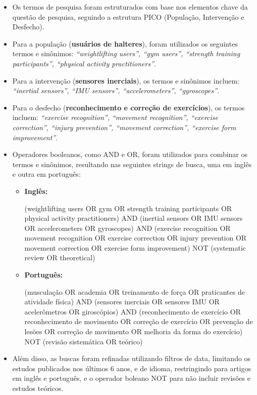 \documentclass[a4paper,12pt]{article}
\begin{document}
\begin{itemize}
    \item Os termos de pesquisa foram estruturados com base nos elementos chave da questão de pesquisa, seguindo a estrutura PICO (População, Intervenção e Desfecho).
    
    \item Para a população (\textbf{usuários de halteres}), foram utilizados os seguintes termos e sinônimos: \textit{“weightlifting users”, “gym users”, “strength training participants”, “physical activity practitioners”}.
    
    \item Para a intervenção (\textbf{sensores inerciais}), os termos e sinônimos incluem: \textit{“inertial sensors”, “IMU sensors”, “accelerometers”, “gyroscopes”}.
    
    \item Para o desfecho (\textbf{reconhecimento e correção de exercícios}), os termos incluem: \textit{“exercise recognition”, “movement recognition”, “exercise correction”, “injury prevention”, “movement correction”, “exercise form improvement”}.
    
    \item Operadores booleanos, como AND e OR, foram utilizados para combinar os termos e sinônimos, resultando nas seguintes strings de busca, uma em inglês e outra em português:
    
    \begin{itemize}
        \item \textbf{Inglês:} \newline
        \begin{RaggedRight}
        (weightlifting users OR gym OR strength training participants OR physical activity practitioners) AND (inertial sensors OR IMU sensors OR accelerometers OR gyroscopes) AND (exercise recognition OR movement recognition OR exercise correction OR injury prevention OR movement correction OR exercise form improvement) NOT (systematic review OR theoretical)
        \end{RaggedRight}
        
        \item \textbf{Português:} 
        \begin{RaggedRight}
        (musculação OR academia OR treinamento de força OR praticantes de atividade física) AND (sensores inerciais OR sensores IMU OR acelerômetros OR giroscópios) AND (reconhecimento de exercício OR reconhecimento de movimento OR correção de exercício OR prevenção de lesões OR correção de movimento OR melhoria da forma do exercício) NOT (revisão sistemática OR teórico)
        \end{RaggedRight}
    \end{itemize}
    
    \item Além disso, as buscas foram refinadas utilizando filtros de data, limitando os estudos publicados nos últimos 6 anos, e de idioma, restringindo para artigos em inglês e português, e o operador boleano NOT para não incluir revisões e estudos teóricos.
\end{itemize}
\end{document}
